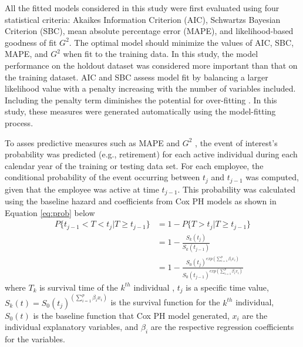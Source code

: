 All the fitted models considered in this study were first evaluated using four statistical criteria: Akaikes Information Criterion (AIC), Schwartzs Bayesian Criterion (SBC), mean absolute percentage error (MAPE), and likelihood-based goodness of fit $G^2$. The optimal  model should  minimize the  values of AIC, SBC, MAPE, and $G^2$ when fit to the training data. In this study, the model performance on the holdout dataset was considered more important than that on the training dataset. AIC and SBC assess model fit by balancing a larger likelihood value with a penalty increasing with the number of variables included. Including the penalty term diminishes the potential for over-fitting \citep{allison2010,hosmer2013}. In this study, these measures were generated automatically using the model-fitting process.

To asses predictive measures such as MAPE and $G^2$ , the event of interest's probability was predicted (e.g., retirement) for each active individual during each calendar year of the training or testing data set. For each employee, the conditional probability of the event occurring between $t_j$ and $t_{j-1}$ was computed, given that the employee was active at time $t_{j-1}$. This probability was calculated using the baseline hazard and coefficients from Cox PH models as shown in Equation \ref{eq:prob} below
\begin{equation}
\label{eq:prob}
\begin{split}%
P\{t_{j-1}<T<t_j|T \ge t_{j-1}\} &=1-P\{T>t_j|T \ge t_{j-1}\}\\
&=1-\frac{S_k(t_j)}{S_k{(t_{j-1})}}   \\
&=1-\frac{{S_0(t_j)}^{exp(\sum_{i=1}^{p}\beta_ix_i)}}{   {S_0(t_{j-1})}^{exp(\sum_{i=1}^{p}\beta_ix_i)}}
\end{split}
\end{equation}
where $T_k$ is survival time of the $k^{th}$ individual , $t_j$ is a specific time value, $S_k(t) = {S_0(t_j)}^{(\sum_{i=1}^{p}\beta_ix_i)}$ is the survival function for the $k^{th}$ individual, $S_0(t)$ is the baseline function that Cox PH model generated, $x_i$ are the individual explanatory variables, and $\beta_i$ are the respective regression coefficients for the variables.

